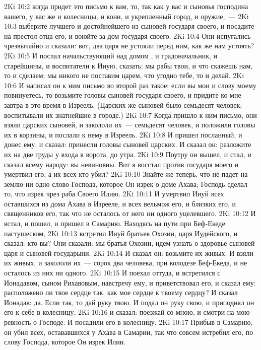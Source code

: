 \vs 2Ki 10:2 когда придет это письмо к вам, то, так как у вас и сыновья господина вашего, у вас же и колесницы, и кони, и укрепленный город, и оружие,~---
\vs 2Ki 10:3 выберите лучшего и достойнейшего из сыновей государя своего, и посадите на престол отца его, и воюйте за дом государя своего.
\vs 2Ki 10:4 Они испугались чрезвычайно и сказали: вот, два царя не устояли перед ним, как же нам устоять?
\vs 2Ki 10:5 И послал начальствующий над домом , и градоначальник, и старейшины, и воспитатели к Ииую, сказать: мы рабы твои, и что скажешь нам, то и сделаем; мы никого не поставим царем, что угодно тебе, то и делай.
\vs 2Ki 10:6 И написал он к ним письмо во второй раз такое: если вы мои и слову моему повинуетесь, то возьмите головы сыновей государя своего, и придите ко мне завтра в это время в Изреель. (Царских же сыновей было семьдесят человек; воспитывали их знатнейшие в городе.)
\vs 2Ki 10:7 Когда пришло к ним письмо, они взяли царских сыновей, и закололи их~--- семьдесят человек, и положили головы их в корзины, и послали к нему в Изреель.
\vs 2Ki 10:8 И пришел посланный, и донес ему, и сказал: принесли головы сыновей царских. И сказал он: разложите их на две груды у входа в ворота, до утра.
\vs 2Ki 10:9 Поутру он вышел, и стал, и сказал всему народу: вы невиновны. Вот я восстал против государя моего и умертвил его, а их всех кто убил?
\vs 2Ki 10:10 Знайте же теперь, что не падет на землю ни одно слово Господа, которое Он изрек о доме Ахава; Господь сделал то, что изрек чрез раба Своего Илию.
\vs 2Ki 10:11 И умертвил Ииуй всех оставшихся из дома Ахава в Изрееле, и всех вельмож его, и близких его, и священников его, так что не осталось от него ни одного уцелевшего.
\vs 2Ki 10:12 И встал, и пошел, и пришел в Самарию. Находясь на пути при Беф-Екеде пастушеском,
\vs 2Ki 10:13 встретил Ииуй братьев Охозии, царя Иудейского, и сказал: кто вы? Они сказали: мы братья Охозии, идем узнать о здоровье сыновей царя и сыновей государыни.
\vs 2Ki 10:14 И сказал он: возьмите их живых. И взяли их живых, и закололи их~--- сорок два человека, при колодезе Беф-Екеда, и не осталось из них ни одного.
\vs 2Ki 10:15 И поехал оттуда, и встретился с Ионадавом, сыном Рихавовым,  навстречу ему, и приветствовал его, и сказал ему: расположено ли твое сердце так, как мое сердце к твоему сердцу? И сказал Ионадав: да. Если так, то дай руку твою. И подал он руку свою, и приподнял он его к себе в колесницу,
\vs 2Ki 10:16 и сказал: поезжай со мною, и смотри на мою ревность о Господе. И посадили его в колесницу.
\vs 2Ki 10:17 Прибыв в Самарию, он убил всех, остававшихся у Ахава в Самарии, так что совсем истребил его, по слову Господа, которое Он изрек Илии.

